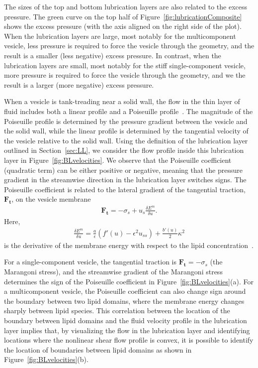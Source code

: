 \documentclass[twoside,twocolumn,9pt]{article}
\renewcommand{\tt}{\mathbf{t}}
\begin{document}
The sizes of the top and bottom lubrication layers are also related to
the excess pressure. The green curve on the top half of
Figure~\ref{fig:lubricationComposite} shows the excess pressure (with
the axis aligned on the right side of the plot). When the lubrication
layers are large, most notably for the multicomponent vesicle, less
pressure is required to force the vesicle through the geometry, and the
result is a smaller (less negative) excess pressure. In contrast, when
the lubrication layers are small, most notably for the stiff
single-component vesicle, more pressure is required to force the vesicle
through the geometry, and we the result is a larger (more negative)
excess pressure.

When a vesicle is tank-treading near a solid wall, the flow in the thin
layer of fluid includes both a linear profile and a Poiseuille
profile~\cite{mis-wis-ber-key-li-tun-law-per-erd-zha-zha-sun-kal-lam-kon2019}.
The magnitude of the Poiseuille profile is determined by the pressure
gradient between the vesicle and the solid wall, while the linear
profile is determined by the tangential velocity of the vesicle relative
to the solid wall. Using the definition of the lubrication layer
outlined in Section~\ref{sec:LL}, we consider the flow profile inside
this lubrication layer in Figure~\ref{fig:BLvelocities}. We observe that
the Poiseuille coefficient (quadratic term) can be either positive or
negative, meaning that the pressure gradient in the streamwise direction
in the lubrication layer switches signs. The Poiseuille coefficient is
related to the lateral gradient of the tangential traction,
$\mathbf{F}_\tt$, on the vesicle membrane~\cite{Oron1997_RMP,
Young2014_JFM}
\begin{align}
  \mathbf{F}_{\tt} = -\sigma_s + u_s \frac{\delta E^m}{\delta u}.
\end{align}
Here,
\begin{align}
  \frac{\delta E^m}{\delta u} = \frac{a}{\epsilon} 
    (f'(u) - \epsilon^2 u_{ss}) + \frac{b'(u)}{2} \kappa^2
\end{align}
is the derivative of the membrane energy with respect to the lipid
concentration~\cite{soh-tse-li-voi-low2010}. 

For a single-component vesicle,
the tangential traction is $\mathbf{F}_\tt =-\sigma_s$ (the Marangoni stress), and  the streamwise gradient 
of the Marangoni stress determines the sign of the Poiseuille coefficient in Figure~\ref{fig:BLvelocities}(a).
For a multicomponent vesicle, the Poiseuille coefficient can also change sign around the boundary 
between two lipid domains, where the membrane energy changes sharply between lipid species. 
This correlation between the location of the boundary between lipid domains and the fluid velocity profile in the lubrication layer
implies that, by visualizing the flow
in the lubrication layer and identifying locations where the nonlinear shear flow profile is convex, 
it is possible to identify the location of boundaries between lipid domains as shown in Figure~\ref{fig:BLvelocities}(b).
\end{document}
